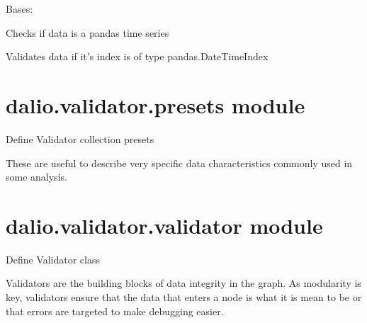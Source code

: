 \documentclass[letterpaper,10pt,english]{sphinxmanual}
\begin{document}
\begin{fulllineitems}
\label{\detokenize{dalio.validator:dalio.validator.pandas_val.IS_PD_TS}}
Bases: {\hyperref[\detokenize{dalio.validator:dalio.validator.base_val.IS_TYPE}]{}}

Checks if data is a pandas time series

\begin{fulllineitems}
\label{\detokenize{dalio.validator:dalio.validator.pandas_val.IS_PD_TS.validate}}
Validates data if it’s index is of type pandas.DateTimeIndex

\end{fulllineitems}


\end{fulllineitems}



\section{dalio.validator.presets module}
\label{\detokenize{dalio.validator:module-dalio.validator.presets}}\label{\detokenize{dalio.validator:dalio-validator-presets-module}}
Define Validator collection presets

These are useful to describe very specific data characteristics commonly used
in some analysis.


\section{dalio.validator.validator module}
\label{\detokenize{dalio.validator:module-dalio.validator.validator}}\label{\detokenize{dalio.validator:dalio-validator-validator-module}}
Define Validator class

Validators are the building blocks of data integrity in the graph. As
modularity is key, validators ensure that the data that enters a node is what
it is mean to be or that errors are targeted to make debugging easier.
\end{document}

